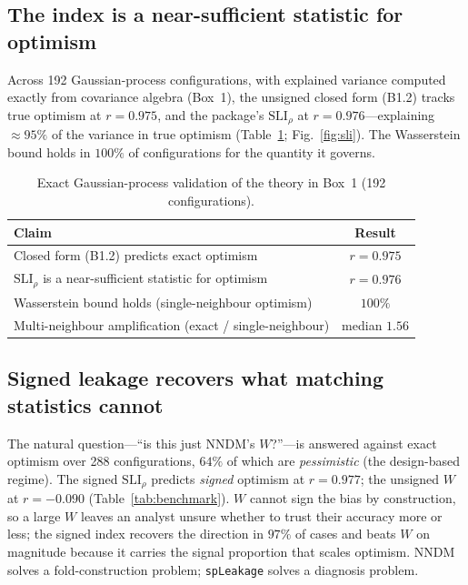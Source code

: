 \documentclass[11pt,a4paper]{article}
\newcommand{\SLI}{\mathrm{SLI}}
\newcommand{\SLIrho}{\SLI_{\rho}}
\begin{document}
\subsection{The index is a near-sufficient statistic for optimism}

Across 192 Gaussian-process configurations, with explained variance computed exactly
from covariance algebra (Box~1), the unsigned closed form (B1.2) tracks true optimism
at $r=0.975$, and the package's $\SLIrho$ at $r=0.976$---explaining $\approx 95\%$ of
the variance in true optimism (Table~\ref{tab:theory}; Fig.~\ref{fig:sli}). The
Wasserstein bound holds in $100\%$ of configurations for the quantity it governs.

\begin{table}[t]
\centering
\caption{Exact Gaussian-process validation of the theory in Box~1 (192
configurations).}
\label{tab:theory}
\small
\begin{tabular}{p{9.2cm} c}
\toprule
Claim & Result\\
\midrule
Closed form (B1.2) predicts exact optimism & $r=0.975$\\
$\SLIrho$ is a near-sufficient statistic for optimism & $r=0.976$\\
Wasserstein bound holds (single-neighbour optimism) & $100\%$\\
Multi-neighbour amplification (exact / single-neighbour) & median $1.56$\\
\bottomrule
\end{tabular}
\end{table}

\subsection{Signed leakage recovers what matching statistics cannot}

The natural question---``is this just NNDM's $W$?''---is answered against exact
optimism over 288 configurations, $64\%$ of which are \emph{pessimistic} (the
design-based regime). The signed $\SLIrho$ predicts \emph{signed} optimism at
$r=0.977$; the unsigned $W$ at $r=-0.090$ (Table~\ref{tab:benchmark}). $W$ cannot
sign the bias by construction, so a large $W$ leaves an analyst unsure whether to
trust their accuracy more or less; the signed index recovers the direction in $97\%$
of cases and beats $W$ on magnitude because it carries the signal proportion that
scales optimism. NNDM solves a fold-construction problem; \texttt{spLeakage} solves a
diagnosis problem.
\end{document}
